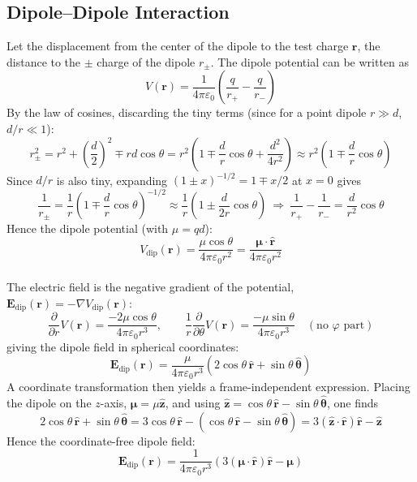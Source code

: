 	\subsection{Dipole--Dipole Interaction}
		
		Let the displacement from the center of the dipole to the test charge $\mathbf{r}$, 
		the distance to the $\pm$ charge of the dipole $r_{\pm}$. The dipole potential can be written as
		\[V(\mathbf{r}) = \frac{1}{4\pi\varepsilon_0}\left(\frac{q}{r_+} - \frac{q}{r_-}\right)\]
		By the law of cosines, discarding the tiny terms (since for a point dipole $r \gg d$, $d/r \ll 1$):
		\[r_{\pm}^{2} = r^{2} + \left(\frac{d}{2}\right)^{2} \mp rd\cos\theta
		= r^{2}\left(1 \mp \frac{d}{r}\cos\theta + \frac{d^{2}}{4r^{2}}\right)
		\approx r^{2}\left(1 \mp \frac{d}{r}\cos\theta\right)\]
		Since $d/r$ is also tiny, expanding $(1\pm x)^{-1/2} = 1 \mp x/2$ at $x = 0$ gives
		\[\frac{1}{r_{\pm}} = \frac{1}{r}\left(1 \mp \frac{d}{r}\cos\theta\right)^{-1/2}
		\approx \frac{1}{r}\left(1 \pm \frac{d}{2r}\cos\theta\right)
		\ \Rightarrow\ 
		\frac{1}{r_+} - \frac{1}{r_-} = \frac{d}{r^{2}}\cos\theta\]
		Hence the dipole potential (with $\mu = qd$):
		\[\boxed{V_{\text{dip}}(\mathbf{r}) = \frac{\mu\cos\theta}{4\pi\varepsilon_0 r^{2}} = \frac{\mathbf{\mu}\cdot\hat{\mathbf{r}}}{4\pi\varepsilon_0 r^{2}}}\]\\
		The electric field is the negative gradient of the potential, $\mathbf{E}_{\text{dip}}(\mathbf{r}) = -\nabla V_{\text{dip}}(\mathbf{r})$:
		\[\frac{\partial}{\partial r}V(\mathbf{r}) = \frac{-2\mu\cos\theta}{4\pi\varepsilon_0 r^{3}}, \qquad
		\frac{1}{r}\frac{\partial}{\partial\theta}V(\mathbf{r}) = \frac{-\mu\sin\theta}{4\pi\varepsilon_0 r^{3}}
		\quad (\text{no } \varphi \text{ part})\]
		giving the dipole field in spherical coordinates:
		\[\mathbf{E}_{\text{dip}}(\mathbf{r}) = \frac{\mu}{4\pi\varepsilon_0 r^{3}}\left(2\cos\theta\,\hat{\mathbf{r}} + \sin\theta\,\hat{\boldsymbol{\theta}}\right)\]
		A coordinate transformation then yields a frame-independent expression. Placing the dipole on the $z$-axis, $\mathbf{\mu} = \mu\hat{\mathbf{z}}$, and using
		$\hat{\mathbf{z}} = \cos\theta\,\hat{\mathbf{r}} - \sin\theta\,\hat{\boldsymbol{\theta}}$, one finds
		\[2\cos\theta\,\hat{\mathbf{r}} + \sin\theta\,\hat{\boldsymbol{\theta}}
		= 3\cos\theta\,\hat{\mathbf{r}} - \left(\cos\theta\,\hat{\mathbf{r}} - \sin\theta\,\hat{\boldsymbol{\theta}}\right)
		= 3(\hat{\mathbf{z}}\cdot\hat{\mathbf{r}})\hat{\mathbf{r}} - \hat{\mathbf{z}}\]
		Hence the coordinate-free dipole field:
		\[\boxed{\mathbf{E}_{\text{dip}}(\mathbf{r}) = \frac{1}{4\pi\varepsilon_0 r^{3}}\left(3(\mathbf{\mu}\cdot\hat{\mathbf{r}})\hat{\mathbf{r}} - \mathbf{\mu}\right)}\]\\
